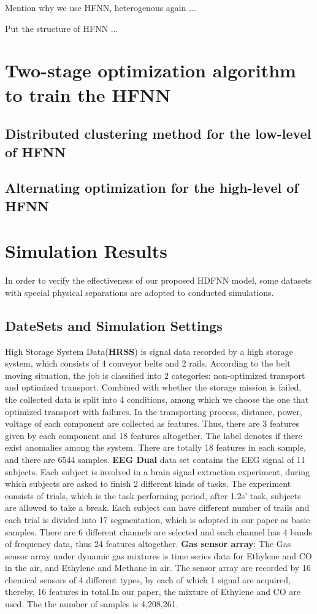 \documentclass[journal,twocolumn,10pt]{IEEEtran}
\begin{document}
Mention why we use HFNN, heterogenous again ...

Put the structure of HFNN ...


\section{Two-stage optimization algorithm to train the HFNN}
\subsection{Distributed clustering method for the low-level of HFNN}

\subsection{Alternating optimization for the high-level of HFNN}

\section{Simulation Results}
In order to verify the effectiveness of our proposed HDFNN model, some datasets with special physical separations are adopted to conducted simulations.
\subsection{DateSets and Simulation Settings}

High Storage System Data(\textbf{HRSS})\cite{von2017using, hranisavljevic2016novel, von2018enable} is signal data recorded by a high storage system, which consists of 4 conveyor belts and 2 rails. According to the belt moving situation, the job is classified into 2 categories: non-optimized transport and optimized transport. Combined with whether the storage mission is failed, the collected data is split into 4 conditions, among which we choose the one that optimized transport with failures. In the transporting process, distance, power, voltage of each component are collected as features. Thus, there are 3 features given by each component and 18 features altogether. The label denotes if there exist anomalies among the system. There are totally 18 features in each sample, and there are 6544 samples.   \textbf{EEG Dual} data set contains the EEG signal of 11 subjects. Each subject is involved in a brain signal extraction experiment, during which subjects are asked to finish 2 different kinds of tasks. The experiment consists of trials, which is the task performing period, after 1.2s' task, subjects are allowed to take a break. Each subject can have different number of trails and each trial is divided into 17 segmentation, which is adopted in our paper as basic samples. There are 6 different channels are selected and each channel has 4 bands of frequency data, thus 24 features altogether. \textbf{Gas sensor array}: The Gas sensor array under dynamic gas mixtures is time series data for Ethylene and CO in the air, and Ethylene and Methane in air. The sensor array are recorded by 16 chemical sensors of 4 different types, by each of which 1 signal are acquired, thereby, 16 features in total.In our paper, the mixture of Ethylene and CO are used. The the number of samples is 4,208,261.
\end{document}
